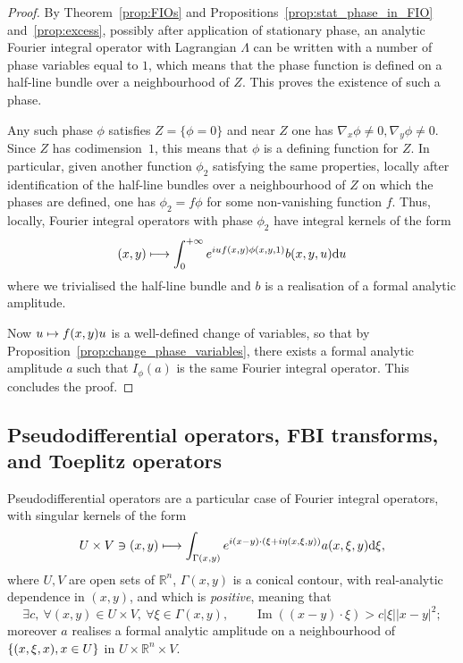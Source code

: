 \documentclass[AHL,Unicode,longabstracts,published]{cedram}
\DeclareMathOperator{\im}{Im}
\newcommand\1{\mathds{1}}
\newcommand{\R}{\mathbb{R}}
\newcommand{\dd}{\mathrm{d}}
\let\oldexists\exists
\renewcommand*{\exists}{\mathrel{\oldexists}}
\let\oldforall\forall
\renewcommand*{\forall}{\mathrel{\oldforall}}
\let\oldmapsto\mapsto
\renewcommand*{\mapsto}{\mathchoice{\longmapsto}{\oldmapsto}{\oldmapsto}{\oldmapsto}}
\begin{document}
\begin{proof}
By Theorem~\ref{prop:FIOs} and Propositions~\ref{prop:stat_phase_in_FIO} and~\ref{prop:excess}, possibly after application of stationary phase, an analytic Fourier integral operator with Lagrangian $\Lambda$ can be written with a number of phase variables equal to $1$, which means that the phase function is defined on a half-line bundle over a neighbourhood of $Z$. This proves the existence of such a phase.

Any such phase $\phi$ satisfies $Z=\{\phi=0\}$ and near $Z$ one has $\nabla_x\phi\neq 0,\nabla_y\phi\neq 0$. Since $Z$ has codimension~$1$, this means that $\phi$ is a defining function for $Z$. In particular, given another function $\phi_2$ satisfying the same properties, locally after identification of the half-line bundles over a neighbourhood of $Z$ on which the phases are defined, one has $\phi_2=f\phi$ for some non-vanishing function $f$. Thus, locally, Fourier {integral operators} with phase $\phi_2$ have integral kernels of the form
\[
(x,y)\mapsto \int_0^{+\infty}e^{iuf(x,y)\phi(x,y,1)}b(x,y,u)\dd u
\]
where we trivialised the half-line bundle and $b$ is a realisation of a formal analytic amplitude.

Now $u\mapsto f(x,y)u$ is a well-defined change of variables, so that by Proposition~\ref{prop:change_phase_variables}, there exists a formal analytic amplitude $a$ such that $I_{\phi}(a)$ is the same Fourier integral operator. This concludes the proof.
\end{proof}

\subsection{Pseudodifferential operators, FBI transforms, and Toeplitz operators}\label{sec:pseud-oper-1}

Pseudodifferential operators are a particular case of Fourier integral operators, with singular kernels of the form
\begin{equation}\label{eq:kernel_pseudos}
U\times V\ni (x,y)\mapsto \int_{\Gamma(x,y)} e^{i(x-y)\cdot (\xi+i\eta(x,\xi,y))}a(x,\xi,y)\dd \xi,
\end{equation}
where $U,V$ are open sets of $\R^n$, $\Gamma(x,y)$ is a conical contour, with real-analytic dependence in $(x,y)$, and which is \emph{positive}, meaning that
\begin{equation}\label{eq:good_ctr_pseudo}
\exists c, \:\forall (x,y)\in U\times V,\: \forall \xi\in \Gamma(x,y),\qquad\im((x-y)\cdot \xi)>c|\xi||x-y|^2;
\end{equation}
moreover $a$ realises a formal analytic amplitude on a neighbourhood of $\{(x,\xi,x),\linebreak x\in U\}$ in $U\times \R^n\times V$.
\end{document}
